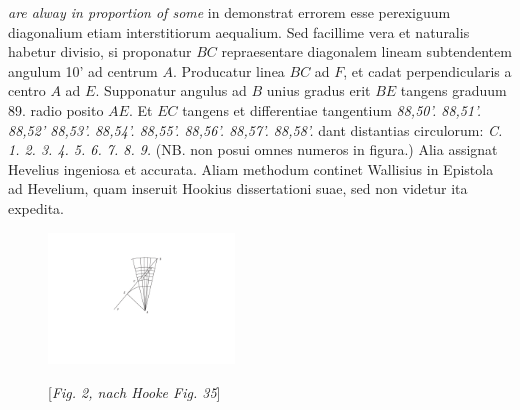 \textit{are alway in proportion of some}   in  demonstrat errorem esse perexiguum diagonalium etiam interstitiorum aequalium. Sed facillime vera et naturalis habetur divisio, si proponatur $BC$ repraesentare diagonalem lineam subtendentem angulum 10' ad centrum $A$. Producatur linea $BC$ ad $F$, et cadat perpendicularis a centro $A$ ad $E$. Supponatur angulus ad $B$ unius gradus erit $BE$ tangens graduum 89. radio posito $AE$. Et $EC$ tangens  et differentiae tangentium \textit{88,50'. 88,51'. 88,52' 88,53'. 88,54'. 88,55'. 88,56'. 88,57'. 88,58'.}  dant distantias circulorum: \textit{C. 1. 2. 3. 4. 5. 6. 7. 8. 9.}  (NB. non posui omnes numeros in figura.) Alia  assignat Hevelius\protect{} ingeniosa et accurata. Aliam methodum continet Wallisius\protect{} in Epistola ad Hevelium\protect{}, quam inseruit Hookius\protect{} dissertationi suae, sed non videtur ita expedita. 
\pend 
\newpage
\pstart
\noindent
\begin{figure}   
\vspace{-8mm}                 
\includegraphics[trim = 0mm 2mm 0mm 0mm, clip, width=0.44\textwidth]{images/lh0351506_11r-d1.pdf}\\
\centering \rule[0pt]{0mm}{0pt}[\textit{Fig. 2, nach Hooke Fig. 35}]
\end{figure}
